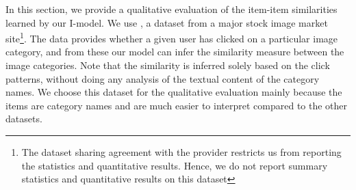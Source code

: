 In this section, we provide a qualitative evaluation of the item-item similarities learned by our I-\LinearLow model.
We use \Fotolia, a dataset from a major stock image market site\footnote{\scriptsize The dataset sharing agreement with the provider restricts us from reporting the statistics and quantitative results. Hence, we do not report summary statistics and quantitative results on this dataset}.
The data provides whether a given user has clicked on a particular image category, and from these our model can infer the similarity measure between
the image categories. Note that the similarity is inferred solely based on the click patterns, without doing any analysis of the textual content of
the category names.
We choose this dataset for the qualitative evaluation mainly because the items are category names and are much easier to interpret
compared to the other datasets.






